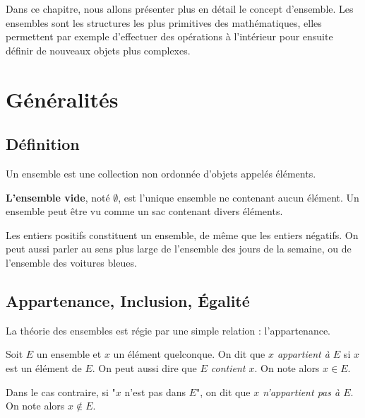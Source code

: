 
Dans ce chapitre, nous allons présenter plus en détail le concept d'ensemble. 
Les ensembles sont les structures les plus primitives des mathématiques, elles permettent par exemple d'effectuer des opérations 
à l'intérieur pour ensuite définir de nouveaux objets plus complexes. 


\section{Généralités}

\subsection{Définition}

\begin{definition}[Ensemble]
    Un ensemble est une collection non ordonnée d'objets appelés éléments. 
\end{definition}

\textbf{L'ensemble vide}, noté $ \emptyset $, est l’unique ensemble ne contenant aucun élément. 
Un ensemble peut être vu comme un sac contenant divers éléments. 

\begin{example}
    Les entiers positifs constituent un ensemble, de même que les entiers négatifs. 
    On peut aussi parler au sens plus large de l'ensemble des jours de la semaine, ou de l'ensemble 
    des voitures bleues. 
\end{example}

\subsection{Appartenance, Inclusion, Égalité}

La théorie des ensembles est régie par une simple relation : l'appartenance. 

\begin{definition}[Appartenance]
    Soit $E$ un ensemble et $x$ un élément quelconque. 
    On dit que \emph{$x$ appartient à $E$} si $x$ est un élément de $E$. 
    On peut aussi dire que \emph{$E$ contient $x$}. On note alors 
    $x \in E$. 

    Dans le cas contraire, si "$x$ n'est pas dans $E$", on dit que 
    \emph{$x$ n'appartient pas à $E$}. 
    On note alors $x \notin E$. 
\end{definition}

